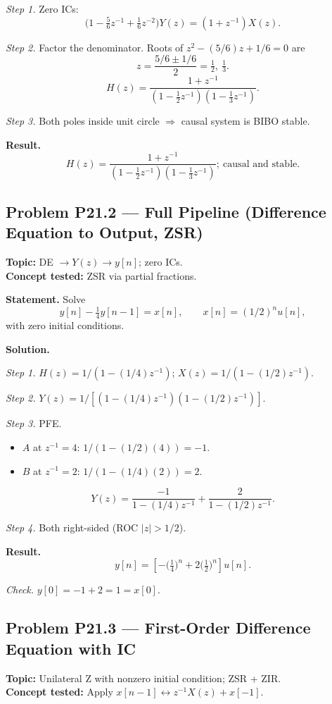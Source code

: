 \documentclass[11pt]{article}
\begin{document}
\textit{Step 1.} Zero ICs:
\[
\bigl(1-\tfrac{5}{6}z^{-1}+\tfrac{1}{6}z^{-2}\bigr)Y(z) = (1+z^{-1})X(z).
\]

\textit{Step 2.} Factor the denominator. Roots of $z^{2}-(5/6)z+1/6=0$ are
\[
z = \frac{5/6\pm 1/6}{2} = \tfrac{1}{2},\ \tfrac{1}{3}.
\]
\[
H(z) = \frac{1+z^{-1}}{(1-\tfrac{1}{2}z^{-1})(1-\tfrac{1}{3}z^{-1})}.
\]

\textit{Step 3.} Both poles inside unit circle $\Rightarrow$ causal system is BIBO stable.

\textbf{Result.}
\[
\boxed{\,H(z) = \frac{1+z^{-1}}{(1-\tfrac{1}{2}z^{-1})(1-\tfrac{1}{3}z^{-1})};\ \text{causal and stable.}\,}
\]

\subsection{Problem P21.2 --- Full Pipeline (Difference Equation to Output, ZSR)}
\textbf{Topic:} DE $\to Y(z)\to y[n]$; zero ICs.\\
\textbf{Concept tested:} ZSR via partial fractions.

\textbf{Statement.} Solve
\[
y[n]-\tfrac{1}{4}y[n-1] = x[n],\qquad x[n] = (1/2)^{n}u[n],
\]
with zero initial conditions.

\textbf{Solution.}

\textit{Step 1.} $H(z) = 1/(1-(1/4)z^{-1})$; $X(z) = 1/(1-(1/2)z^{-1})$.

\textit{Step 2.} $Y(z) = 1/[(1-(1/4)z^{-1})(1-(1/2)z^{-1})]$.

\textit{Step 3.} PFE.
\begin{itemize}
\item $A$ at $z^{-1}=4$: $1/(1-(1/2)(4)) = -1$.
\item $B$ at $z^{-1}=2$: $1/(1-(1/4)(2)) = 2$.
\end{itemize}
\[
Y(z) = \frac{-1}{1-(1/4)z^{-1}}+\frac{2}{1-(1/2)z^{-1}}.
\]

\textit{Step 4.} Both right-sided (ROC $|z|>1/2$).

\textbf{Result.}
\[
\boxed{\,y[n] = \left[-\bigl(\tfrac{1}{4}\bigr)^{n}+2\bigl(\tfrac{1}{2}\bigr)^{n}\right]u[n].\,}
\]

\textit{Check.} $y[0] = -1+2 = 1 = x[0]$. \checkmark

\subsection{Problem P21.3 --- First-Order Difference Equation with IC}
\textbf{Topic:} Unilateral Z with nonzero initial condition; ZSR + ZIR.\\
\textbf{Concept tested:} Apply $x[n-1]\leftrightarrow z^{-1}X(z)+x[-1]$.
\end{document}
